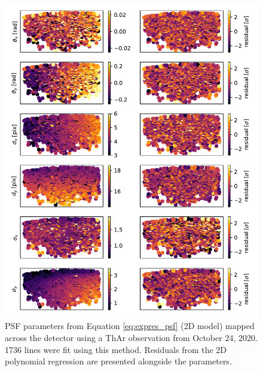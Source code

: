 \begin{figure}
    \centering
    \includegraphics[width=\textwidth]{figures-5/psf-params-2d.pdf}
    \caption[EXPRES two-dimensional point spread function model parameters]{PSF parameters from Equation \ref{eq:expres_psf} (2D model) mapped across the detector using a ThAr observation from October 24, 2020. 1736 lines were fit using this method. Residuals from the 2D polynomial regression are presented alongside the parameters.}
    \label{fig:psf-params-2d}
\end{figure}

